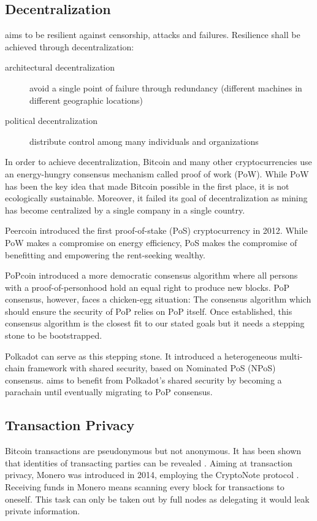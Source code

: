 \documentclass[conference]{IEEEtran}
\begin{document}
\subsection{Decentralization}

\encointer aims to be resilient against censorship, attacks and failures. Resilience shall be achieved through decentralization:

\begin{description}
	\item[architectural decentralization] avoid a single point of failure through redundancy (different machines in different geographic locations)
	\item[political decentralization] distribute control among many individuals and organizations
\end{description}

In order to achieve decentralization, Bitcoin and many other cryptocurrencies use an energy-hungry consensus mechanism called proof of work (PoW). While PoW has been the key idea that made Bitcoin possible in the first place, it is not ecologically sustainable. Moreover, it failed its goal of decentralization as mining has become centralized by a single company in a single country. 

Peercoin \cite{sunnyking12} introduced the first proof-of-stake (PoS) cryptocurrency in 2012. While PoW makes a compromise on energy efficiency, PoS makes the compromise of benefitting and empowering the rent-seeking wealthy.

PoPcoin \cite{pop} introduced a more democratic consensus algorithm where all persons with a proof-of-personhood hold an equal right to produce new blocks. PoP consensus, however, faces a chicken-egg situation: The consensus algorithm which should ensure the security of PoP relies on PoP itself. Once established, this consensus algorithm is the closest fit to our stated goals but it needs a stepping stone to be bootstrapped.

Polkadot \cite{polkadot} can serve as this stepping stone. It introduced a heterogeneous multi-chain framework with shared security, based on Nominated PoS (NPoS) consensus. \encointer aims to benefit from Polkadot's shared security by becoming a parachain until eventually migrating to PoP consensus.

\subsection{Transaction Privacy}
Bitcoin transactions are pseudonymous but not anonymous. It has been shown that identities of transacting parties can be revealed \cite{reid12}. Aiming at transaction privacy, Monero was introduced in 2014, employing the CryptoNote protocol \cite{saberhagen14}. Receiving funds in Monero means scanning every block for transactions to oneself. This task can only be taken out by full nodes as delegating it would leak private information. 
\end{document}

